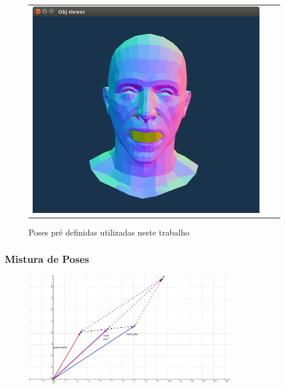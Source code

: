 \documentclass[brazil]{beamer}
\begin{document}
\begin{frame}
\begin{itemize}
\begin{figure}
\begin{tabular}{ccc}
\includegraphics[width=0.3\linewidth]{./img/open-mouth.png} \\
	\end{tabular}
	\caption{Poses pré definidas utilizadas neste trabalho}
     \end{figure}         
  \end{itemize} 
\end{frame}

\begin{frame}
\frametitle{Mistura de Poses}

	\begin{figure}
        \centering
        \includegraphics[width = 0.8\textwidth, keepaspectratio]{./img/misturaPosesExplained000.png}
      \end{figure}
\end{frame}
 
\end{document}
